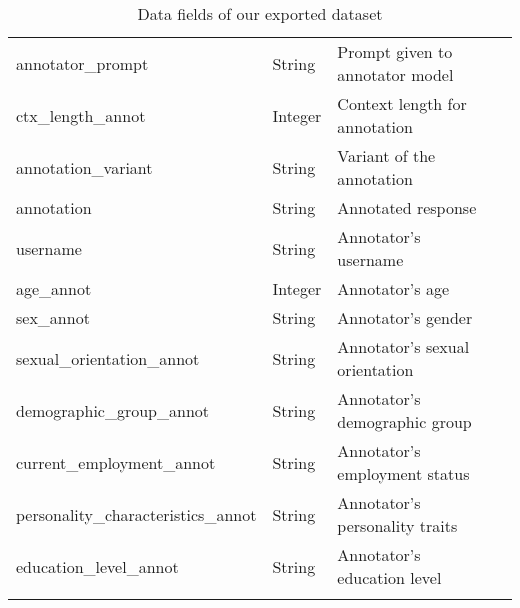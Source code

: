 \begin{longtable}{|l|l|l|p{4cm}|}
    annotator\_prompt & String & Prompt given to annotator model \\
    ctx\_length\_annot & Integer & Context length for annotation \\
    annotation\_variant & String & Variant of the annotation \\
    annotation & String & Annotated response \\
    username & String & Annotator's username \\
    age\_annot & Integer & Annotator's age \\
    sex\_annot & String & Annotator's gender \\
    sexual\_orientation\_annot & String & Annotator's sexual orientation \\
    demographic\_group\_annot & String & Annotator's demographic group \\
    current\_employment\_annot & String & Annotator's employment status \\    personality\_characteristics\_annot & String & Annotator's personality traits \\
    education\_level\_annot & String & Annotator's education level \\
    \caption{Data fields of our exported dataset}
	\label{tab:dataset}
\end{longtable}